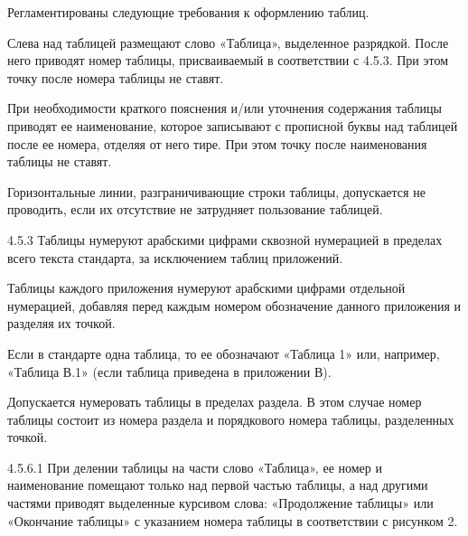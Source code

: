 \documentclass[12pt, twoside, final]{ruost}
\begin{document}
\begin{OST}
				\point Регламентированы следующие требования к оформлению таблиц.
				
					\begin{stdquote}
						\par Слева над таблицей размещают слово «Таблица», выделенное разрядкой. После него приводят номер таблицы, присваиваемый в соответствии с 4.5.3. При этом точку после номера таблицы не ставят.
						\par При необходимости краткого пояснения и/или уточнения содержания таблицы приводят ее наименование, которое записывают с прописной буквы над таблицей после ее номера, отделяя от него тире. При этом точку после наименования таблицы не ставят.
						\par Горизонтальные линии, разграничивающие строки таблицы, допускается не проводить, если их отсутствие не затрудняет пользование таблицей.
						\par [ГОСТ 1.5---2001, пункт 4.5.2]
					\end{stdquote}
					
					\begin{stdquote}
						\par 4.5.3 Таблицы нумеруют арабскими цифрами сквозной нумерацией в пределах всего текста стандарта, за исключением таблиц приложений.
						\par Таблицы каждого приложения нумеруют арабскими цифрами отдельной нумерацией, добавляя перед каждым номером обозначение данного приложения и разделяя их точкой.
						\par Если в стандарте одна таблица, то ее обозначают «Таблица 1» или, например, «Таблица В.1» (если таблица приведена в приложении В).
						\par Допускается нумеровать таблицы в пределах раздела. В этом случае номер таблицы состоит из номера раздела и порядкового номера таблицы, разделенных точкой.
						\par [ГОСТ 1.5---2001]
					\end{stdquote}
					
					\begin{stdquote}
						\par 4.5.6.1 При делении таблицы на части слово «Таблица», ее номер и наименование помещают только над первой частью таблицы, а над другими частями приводят выделенные курсивом слова: «Продолжение таблицы» или «Окончание таблицы» с указанием номера таблицы в соответствии с рисунком 2.
						\par [ГОСТ 1.5---2001]
					\end{stdquote}
					

\end{OST}
\end{document}
